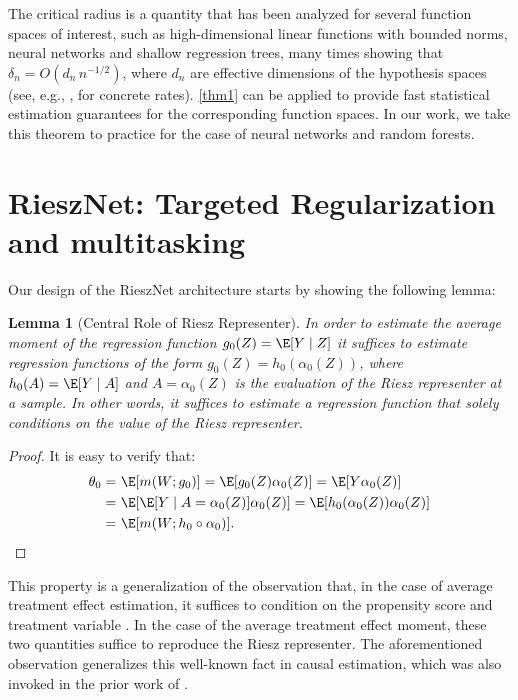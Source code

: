 \documentclass[nohyperref]{article}
\theoremstyle{plain}
\newtheorem{lemma}[theorem]{Lemma}
\theoremstyle{definition}
\theoremstyle{remark}
\begin{document}
The critical radius is a quantity that has been analyzed for several function spaces of interest, such as high-dimensional linear functions with bounded norms, neural networks and shallow regression trees, many times showing that $\delta_n = O(d_n\, n^{-1/2})$, where $d_n$ are effective dimensions of the hypothesis spaces (see, e.g., \citealp{chernozhukov2021automatic}, for concrete rates). \cref{thm1} can be applied to provide fast statistical estimation guarantees for the corresponding function spaces. %
In our work, we take this theorem to practice for the case of neural networks and random forests.%

\section{RieszNet: Targeted Regularization and multitasking}\label{sec:riesznet}

Our design of the RieszNet architecture starts by showing the following lemma:
\begin{lemma}[Central Role of Riesz Representer]\label{lem:observation} In order to estimate the average moment of the regression function $g_0(Z)=\E[Y \mid Z]$ it suffices to estimate regression functions of the form $g_0(Z) = h_0(\alpha_0(Z))$, where $h_0(A) = \E[Y \mid A]$ and $A=\alpha_0(Z)$ is the evaluation of the Riesz representer at a sample. In other words, it suffices to estimate a regression function that solely conditions on the value of the Riesz representer.
\end{lemma}
\begin{proof}
It is easy to verify that:
\begin{align*}
    \theta_0 =~& \E[m(W; g_0)] = \E[g_0(Z) \alpha_0(Z)] = \E[Y \alpha_0(Z)]\\
    =~& \E[\E[Y\mid A=\alpha_0(Z)] \alpha_0(Z)] = \E[h_0(\alpha_0(Z)) \alpha_0(Z)] \\ =~& \E[m(W; h_0 \circ \alpha_0)]. \qedhere
\end{align*}
\end{proof}

This property is a generalization of the observation that, in the case of average treatment effect estimation, it suffices to condition on the propensity score and treatment variable  \citep{rosenbaum1983central}. In the case of the average treatment effect moment, these two quantities suffice to reproduce the Riesz representer. The aforementioned observation generalizes this well-known fact in causal estimation, which was also invoked in the prior work of \citet{shi2019adapting}. 
\end{document}
